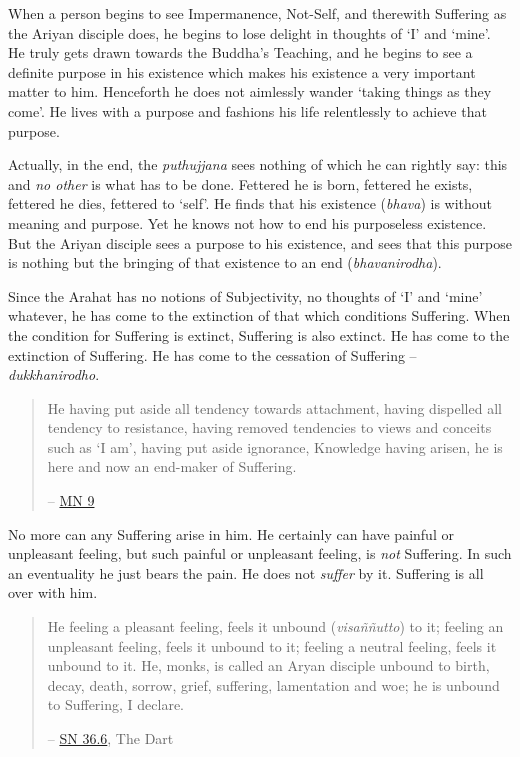 When a person begins to see Impermanence, Not-Self, and therewith Suffering as the Ariyan disciple does, he begins to lose delight in thoughts of `I' and `mine'. He truly gets drawn towards the Buddha's Teaching, and he begins to see a definite purpose in his existence which makes his existence a very important matter to him. Henceforth he does not aimlessly wander `taking things as they come'. He lives with a purpose and fashions his life relentlessly to achieve that purpose.

Actually, in the end, the \textit{puthujjana} sees nothing of which he can rightly say: this and \emph{no other} is what has to be done. Fettered he is born, fettered he exists, fettered he dies, fettered to `self'. He finds that his existence (\textit{bhava}) is without meaning and purpose. Yet he knows not how to end his purposeless existence. But the Ariyan disciple sees a purpose to his existence, and sees that this purpose is nothing but the bringing of that existence to an end (\textit{bhavanirodha}).

Since the Arahat has no notions of Subjectivity, no thoughts of `I' and `mine' whatever, he has come to the extinction of that which conditions Suffering. When the condition for Suffering is extinct, Suffering is also extinct. He has come to the extinction of Suffering. He has come to the cessation of Suffering -- \textit{dukkhanirodho}.

\begin{quote}
He having put aside all tendency towards attachment, having dispelled all tendency to resistance, having removed tendencies to views and conceits such as `I am', having put aside ignorance, Knowledge having arisen, he is here and now an end-maker of Suffering.

 -- \href{https://suttacentral.net/mn9/en/bodhi}{MN 9}
\end{quote}

No more can any Suffering arise in him. He certainly can have painful or unpleasant feeling, but such painful or unpleasant feeling, is \emph{not} Suffering. In such an eventuality he just bears the pain. He does not \emph{suffer} by it. Suffering is all over with him.

\begin{quote}
He feeling a pleasant feeling, feels it unbound (\textit{visaññutto}) to it; feeling an unpleasant feeling, feels it unbound to it; feeling a neutral feeling, feels it unbound to it. He, monks, is called an Aryan disciple unbound to birth, decay, death, sorrow, grief, suffering, lamentation and woe; he is unbound to Suffering, I declare.

 -- \href{https://suttacentral.net/sn36.6/en/bodhi}{SN 36.6}, The Dart
\end{quote}

